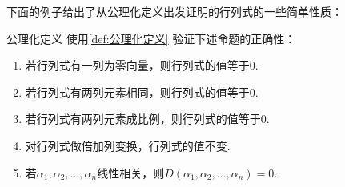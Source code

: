 下面的例子给出了从公理化定义出发证明的行列式的一些简单性质：

\begin{example}{}{公理化定义}
    使用\autoref{def:公理化定义} 验证下述命题的正确性：
    \begin{enumerate}
        \item 若行列式有一列为零向量，则行列式的值等于0.

        \item 若行列式有两列元素相同，则行列式的值等于0.

        \item 若行列式有两列元素成比例，则行列式的值等于0.

        \item 对行列式做倍加列变换，行列式的值不变.

        \item \label{item:13:公理化定义导出性质:5}
            若$\alpha_1,\alpha_2,\ldots,\alpha_n$线性相关，则$D(\alpha_1,\alpha_2,\ldots,\alpha_n)=0$.
    \end{enumerate}
\end{example}

